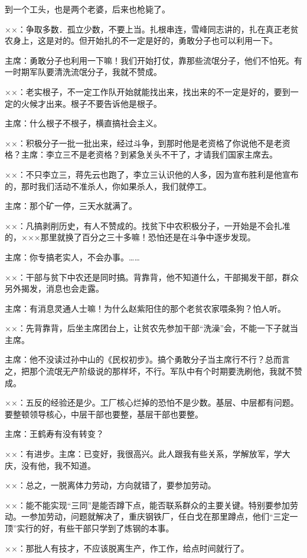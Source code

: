 到一个工头，也是两个老婆，后来也枪毙了。

××：争取多数．孤立少数，不要上当。扎根串连，雪峰同志讲的，扎在真正老贫农身上，这是对的。但开始扎的不一定是好的，勇敢分子也可以利用一下。

主席：勇敢分子也利用一下嘛！我们开始打仗，靠那些流氓分子，他们不怕死。有一时期军队要清洗流氓分子，我就不赞成。

××：老实根子，不一定工作队开始就能找出来，找出来的不一定是好的，要到一定的火候才出来。根子不要告诉他是根子。

主席：什么根子不根子，横直搞社会主义。

××：积极分子一批一批出来，经过斗争，到那时他是老资格了你说他不是老资格？主席：李立三不是老资格？到紧急关头不干了，才请我们国家主席去。

××：不只李立三，蒋先云也跑了，李立三认识他的人多，因为宣布胜利是他宣布的，那时我们活动不准杀人，你如果杀人，我们就停工。

主席：那个矿一停，三天水就满了。

××：凡搞剥削历史，有人不赞成的。找贫下中农积极分子，一开始是不会扎准的，×××那里就换了百分之三十多嘛！恐怕还是在斗争中逐步发现。

主席：你专搞老实人，不会办事。……

××：干部与贫下中农还是同时搞。背靠背，他不知道什么，干部揭发干部，群众另外揭发，消息也会走露。

主席：有消息灵通人士嘛！为什么赵紫阳住的那个老贫农家喂条狗？怕人听。

××：先背靠背，后坐主席团台上，让贫农先参加干部“洗澡”会，不能一下子就当主席。

主席：他不没读过孙中山的《民权初步》。搞个勇敢分子当主席行不行？总而言之，把那个流氓无产阶级说的那样坏，不行。军队中有个时期要洗刷他，我就不赞成。

××：五反的经验还是少。工厂核心烂掉的恐怕不是少数。基层、中层都有问题。要整顿领导核心，中层干部也要整，基层干部也要整。

主席：王鹤寿有没有转变？

××：有进步。主席：已变好，我很高兴。此人跟我有些关系，学解放军，学大庆，没有他，我不知道。

××：总之，一脱离体力劳动，方向就错了，要参加劳动。

××：能不能实现“三同”是能否蹲下点，能否联系群众的主要关键。特别要参加劳动。一参加劳动，问题就解决了，重庆钢铁厂，任白戈在那里蹲点，他们“三定一顶”实行的好，有些干部只学到了炼钢的本事。

××：那批人有技才，不应该脱离生产，作工作，给点时间就行了。


